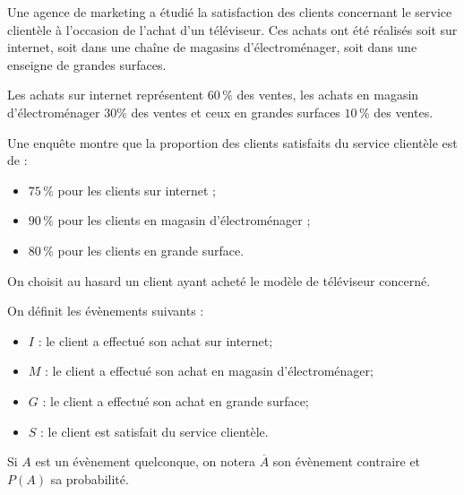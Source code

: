 \medskip

Une agence de marketing a étudié la satisfaction des clients concernant le service clientèle à l'occasion de l'achat d'un téléviseur. Ces achats ont été réalisés soit sur internet, soit dans une chaîne de magasins d'électroménager, soit dans une enseigne de grandes surfaces.

Les achats sur internet représentent $60\,\%$ des ventes, les achats en magasin d'électroménager $30 \%$ des ventes et ceux en grandes surfaces $10\,\%$ des ventes.

Une enquête montre que la proportion des clients satisfaits du service clientèle est de :
\begin{itemize}
	\item $75\,\%$ pour les clients sur internet ;
	\item $90\,\%$ pour les clients en magasin d'électroménager ;
	\item $80\,\%$ pour les clients en grande surface.
\end{itemize}

On choisit au hasard un client ayant acheté le modèle de téléviseur concerné.

On définit les évènements suivants :

\begin{itemize}
	\item $I$ : \og le client a effectué son achat sur internet\fg{};
	\item $M$ : \og le client a effectué son achat en magasin d'électroménager\fg{};
	\item $G$ : \og le client a effectué son achat en grande surface\fg{};
	\item $S$ : \og le client est satisfait du service clientèle\fg{}.
\end{itemize}

Si $A$ est un évènement quelconque, on notera $\overline{A}$ son évènement contraire et $P(A)$ sa probabilité.

